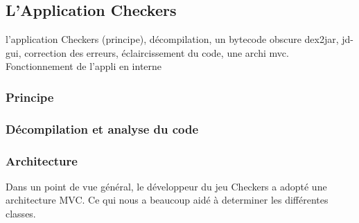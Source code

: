 
\subsection{L'Application Checkers}

l'application Checkers (principe), décompilation, un bytecode obscure
dex2jar, jd-gui, correction des erreurs, éclaircissement du code, une archi mvc.
Fonctionnement de l'appli en interne
\subsubsection{Principe}

\subsubsection{Décompilation et analyse du code}

\subsubsection{Architecture}
Dans un point de vue général, le développeur du jeu Checkers a adopté une architecture MVC. Ce qui nous a beaucoup aidé à determiner les différentes 
classes. 
\begin{figure}[hp]
	      \begin{center}
	      \end{center}
\end{figure}
